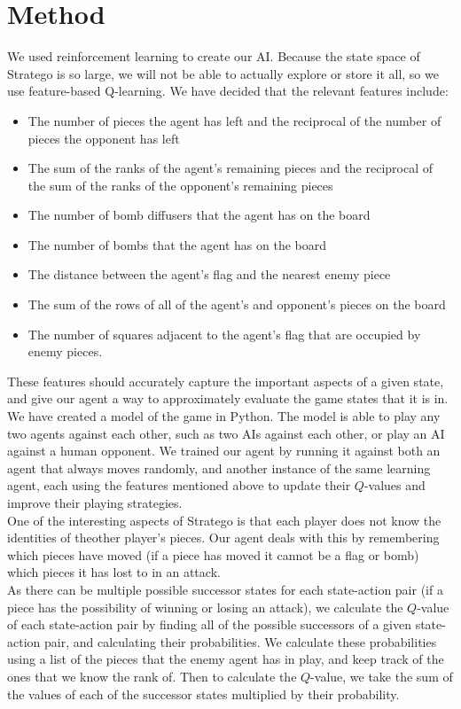 \documentclass[letterpaper]{article}
\begin{document}
\section{Method}
We used reinforcement learning to create our AI. Because the state space of Stratego is so large, we will not be able to actually explore or store it all, so we use feature-based Q-learning. We have decided that the relevant features include: 
\begin{itemize}
\item The number of pieces the agent has left and the reciprocal of the number of pieces the opponent has left
\item The sum of the ranks of the agent's remaining pieces and the reciprocal of the sum of the ranks of the opponent's remaining pieces
\item The number of bomb diffusers that the agent has on the board 
\item The number of bombs that the agent has on the board 
\item The distance between the agent's flag and the nearest enemy piece 
\item  The sum of the rows of all of the agent's and opponent's pieces on the board
\item The number of squares adjacent to the agent's flag that are occupied by enemy pieces.
\end{itemize}
These features should accurately capture the important aspects of a given state, and give our agent a way to approximately 
evaluate the game states that it is in.\\

We have created a model of the game in Python. The model is able to play any two agents against each other, such as two AIs against each other, or play an AI against a human opponent. We trained our agent by running it against both an agent that always moves randomly, and another instance of the same learning agent, each using the features mentioned above to update their $Q$-values and improve their playing strategies.\\

One of the interesting aspects of Stratego is that each player does not know the identities of theother player's pieces. 
Our agent deals with this by remembering which pieces have moved (if a piece has moved it cannot be a flag or bomb) which
pieces it has lost to in an attack. \\

As there can be multiple possible successor states for each state-action pair (if a piece has the possibility of winning
or losing an attack), we calculate the $Q$-value of each state-action pair by finding all of the possible successors of a given state-action pair, and calculating their probabilities. We calculate these probabilities using a list of the pieces that the enemy agent has in play, and keep track of the ones that we know the rank of. Then to calculate the $Q$-value, we take the sum of the values of each of the successor states multiplied by their probability.\\
\end{document}

